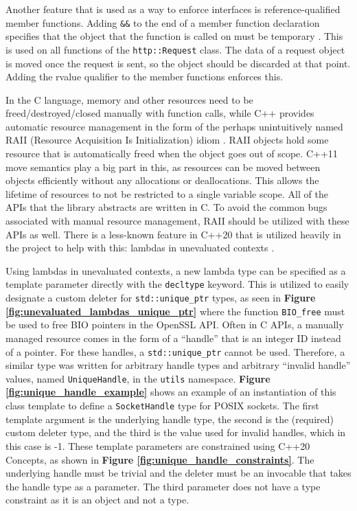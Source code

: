 \documentclass[12pt, a4paper]{article}
\begin{document}
Another feature that is used as a way to enforce interfaces is reference-qualified member functions. Adding \texttt{\&\&} to the end of a member function declaration specifies that the object that the function is called on must be temporary \parencite{CppMemberFunctions}. This is used on all functions of the \texttt{http::Request} class. The data of a request object is moved once the request is sent, so the object should be discarded at that point. Adding the rvalue qualifier to the member functions enforces this.

In the C language, memory and other resources need to be freed/destroyed/closed manually with function calls, while C++ provides automatic resource management in the form of the perhaps unintuitively named RAII (Resource Acquisition Is Initialization) idiom \parencite{CppRAII}. RAII objects hold some resource that is automatically freed when the object goes out of scope. C++11 move semantics play a big part in this, as resources can be moved between objects efficiently without any allocations or deallocations. This allows the lifetime of resources to not be restricted to a single variable scope. All of the APIs that the library abstracts are written in C. To avoid the common bugs associated with manual resource management, RAII should be utilized with these APIs as well. There is a less-known feature in C++20 that is utilized heavily in the project to help with this: lambdas in unevaluated contexts \parencite{UnevaluatedLambdas}.

Using lambdas in unevaluated contexts, a new lambda type can be specified as a template parameter directly with the \texttt{decltype} keyword. This is utilized to easily designate a custom deleter for \texttt{std::unique\_ptr} types, as seen in \textbf{Figure \ref{fig:unevaluated_lambdas_unique_ptr}} where the function \texttt{BIO\_free} must be used to free BIO pointers in the OpenSSL API. Often in C APIs, a manually managed resource comes in the form of a “handle” that is an integer ID instead of a pointer. For these handles, a \texttt{std::unique\_ptr} cannot be used. Therefore, a similar type was written for arbitrary handle types and arbitrary “invalid handle” values, named \texttt{UniqueHandle}, in the \texttt{utils} namespace. \textbf{Figure \ref{fig:unique_handle_example}} shows an example of an instantiation of this class template to define a \texttt{SocketHandle} type for POSIX sockets. The first template argument is the underlying handle type, the second is the (required) custom deleter type, and the third is the value used for invalid handles, which in this case is -1. These template parameters are constrained using C++20 Concepts, as shown in \textbf{Figure \ref{fig:unique_handle_constraints}}. The underlying handle must be trivial and the deleter must be an invocable that takes the handle type as a parameter. The third parameter does not have a type constraint as it is an object and not a type.
\end{document}
